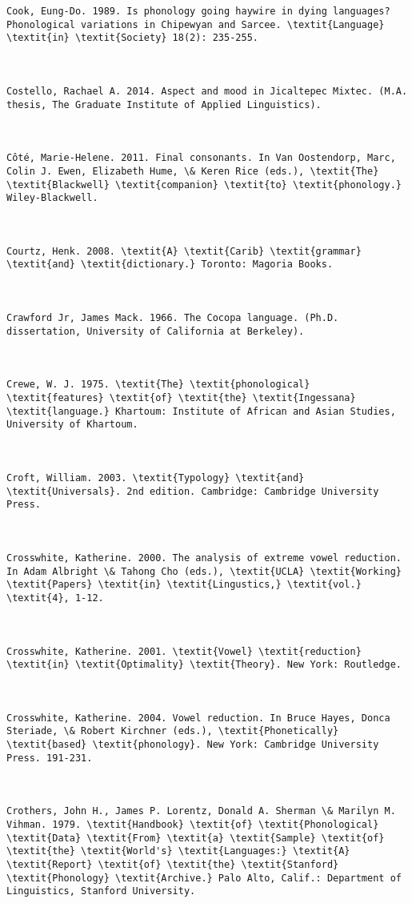 \begin{verbatim}
Cook, Eung-Do. 1989. Is phonology going haywire in dying languages? Phonological variations in Chipewyan and Sarcee. \textit{Language} \textit{in} \textit{Society} 18(2): 235-255.



Costello, Rachael A. 2014. Aspect and mood in Jicaltepec Mixtec. (M.A. thesis, The Graduate Institute of Applied Linguistics).



Côté, Marie-Helene. 2011. Final consonants. In Van Oostendorp, Marc, Colin J. Ewen, Elizabeth Hume, \& Keren Rice (eds.), \textit{The} \textit{Blackwell} \textit{companion} \textit{to} \textit{phonology.} Wiley-Blackwell.



Courtz, Henk. 2008. \textit{A} \textit{Carib} \textit{grammar} \textit{and} \textit{dictionary.} Toronto: Magoria Books.



Crawford Jr, James Mack. 1966. The Cocopa language. (Ph.D. dissertation, University of California at Berkeley).



Crewe, W. J. 1975. \textit{The} \textit{phonological} \textit{features} \textit{of} \textit{the} \textit{Ingessana} \textit{language.} Khartoum: Institute of African and Asian Studies, University of Khartoum.



Croft, William. 2003. \textit{Typology} \textit{and} \textit{Universals}. 2nd edition. Cambridge: Cambridge University Press.



Crosswhite, Katherine. 2000. The analysis of extreme vowel reduction. In Adam Albright \& Tahong Cho (eds.), \textit{UCLA} \textit{Working} \textit{Papers} \textit{in} \textit{Lingustics,} \textit{vol.} \textit{4}, 1-12.



Crosswhite, Katherine. 2001. \textit{Vowel} \textit{reduction} \textit{in} \textit{Optimality} \textit{Theory}. New York: Routledge.



Crosswhite, Katherine. 2004. Vowel reduction. In Bruce Hayes, Donca Steriade, \& Robert Kirchner (eds.), \textit{Phonetically} \textit{based} \textit{phonology}. New York: Cambridge University Press. 191-231.



Crothers, John H., James P. Lorentz, Donald A. Sherman \& Marilyn M. Vihman. 1979. \textit{Handbook} \textit{of} \textit{Phonological} \textit{Data} \textit{From} \textit{a} \textit{Sample} \textit{of} \textit{the} \textit{World's} \textit{Languages:} \textit{A} \textit{Report} \textit{of} \textit{the} \textit{Stanford} \textit{Phonology} \textit{Archive.} Palo Alto, Calif.: Department of Linguistics, Stanford University.




\end{verbatim}
